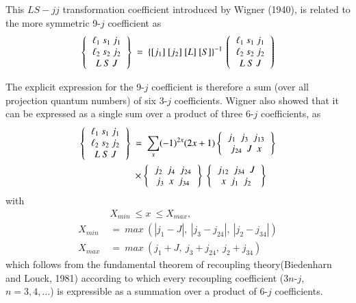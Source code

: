 This $LS-jj$ transformation coefficient introduced by Wigner (1940), is related to the more symmetric 9-$j$ coefficient as
\begin{equation}
\left\{
\begin{tabular}{c}
$\ell_1 \ s_1 \ j_1$\\   
$\ell_2 \ s_2 \ j_2$\\ 
$L \ S \ J$\\ 
\end{tabular}
\right\} \ =\ \{ [j_1]\ [j_2]\ [L]\ [S] \}^{-1}\
\left(
\begin{tabular}{c}
$\ell_1 \ s_1 \ j_1$\\   
$\ell_2 \ s_2 \ j_2$\\ 
$L \ S \ J$\\ 
\end{tabular} 
\right) \label{chap7-eq51}
\end{equation}

The explicit expression for the 9-$j$ coefficient is therefore a sum (over all projection quantum numbers) of six 3-$j$ coefficients. Wigner also showed that it can be expressed as a single sum over a product of three 6-$j$ coefficients, as
\begin{equation}
\begin{split}
\left\{
\begin{tabular}{c}
$\ell_1 \ s_1 \ j_1$\\   
$\ell_2 \ s_2 \ j_2$\\ 
$L \ S \ J$\\ \end{tabular} 
\right\} \
& =\ \sum_x (-1)^{2x} (2x+1) 
\left\{ 
\begin{tabular}{c}
$j_1\ \ j_3\ \ j_{13}$\\ 
$j_{24}\ \ J\ \ x$ \\ 
\end{tabular} 
\right\}\\
& \times \left\{
\begin{tabular}{c}
$j_2\ \ j_4\ \ j_{24}$\\ 
$j_{3}\ \ x\ \ j_{34}$ \\ 
\end{tabular} 
\right\} \
\left\{ 
\begin{tabular}{c} 
$j_{12}\ \ j_{34}\ \ J$\\ 
$x\ \ j_1\ \ j_2$ \\ 
\end{tabular} 
\right\} \label{chap7-eq52}
\end{split}
\end{equation}
with 
\begin{equation}
\begin{split}
& X_{min} \ \leq x \ \leq X_{max},\\
X_{min} \ & =\ max \ (|j_1-J|,\ |j_3-j_{24}|,\ |j_2-j_{34}|)\\
X_{max} \ & =\ max \ (j_1+J,\ j_3+j_{24},\ j_2+j_{34})\label{chap7-eq53}
\end{split}
\end{equation}
which follows from the fundamental theorem of recoupling theory\break (Biedenharn and Louck, 1981) according to which every recoupling coefficient (3$n$-$j$, $n=3,4,\ldots$) is expressible as a summation over a product of 6-$j$ coefficients.

